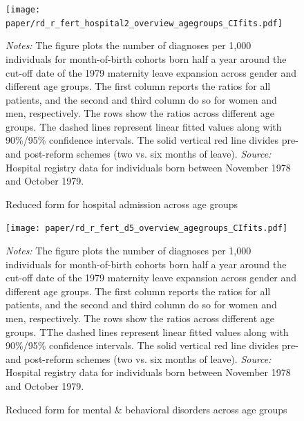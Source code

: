 \documentclass[11pt, a4paper]{article} %
\begin{document}
\restoregeometry  
\begin{landscape}
	\vspace*{\fill}
	\begin{figure}
		[H]\centering
		\caption{Reduced form for hospital admission across age groups}\label{fig: rf_hospital2_agegroup}
		\texttt{[image: paper/rd\_r\_fert\_hospital2\_overview\_agegroups\_CIfits.pdf]}
			\scriptsize
			\begin{minipage}{0.9\linewidth}
				\emph{Notes:} The figure plots the number of diagnoses per 1,000 individuals for month-of-birth cohorts born half a year around the cut-off date of the 1979 maternity leave expansion across gender and different age groups. The first column reports the ratios for all patients, and the second and third column do so for women and men, respectively. The rows show the ratios across different age groups. The dashed lines represent linear fitted values along with 90\%/95\% confidence intervals. The solid vertical red line divides pre- and post-reform schemes (two vs. six months of leave).\newline
				\emph{Source:} Hospital registry data for individuals born between November 1978 and October 1979.
			\end{minipage}
	\end{figure}
	\vspace*{\fill}\clearpage
\end{landscape}

    

\begin{landscape}
	\vspace*{\fill}
	\begin{figure}
		[H]\centering
		\caption{Reduced form for mental \& behavioral disorders across age groups}\label{fig: rf_d5_agegroup}
		\texttt{[image: paper/rd\_r\_fert\_d5\_overview\_agegroups\_CIfits.pdf]}
		\scriptsize
		\begin{minipage}{0.9\linewidth}
		\emph{Notes:} The figure plots the number of diagnoses per 1,000 individuals for month-of-birth cohorts born half a year around the cut-off date of the 1979 maternity leave expansion across gender and different age groups. The first column reports the ratios for all patients, and the second and third column do so for women and men, respectively. The rows show the ratios across different age groups. TThe dashed lines represent linear fitted values along with 90\%/95\% confidence intervals. The solid vertical red line divides pre- and post-reform schemes (two vs. six months of leave).\newline
		\emph{Source:} Hospital registry data for individuals born between November 1978 and October 1979.
		\end{minipage}
	\end{figure}
	\vspace*{\fill}\clearpage
\end{landscape}
\restoregeometry  
\end{document}
